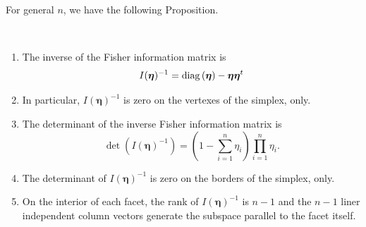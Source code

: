 \documentclass[12pt,a4paper]{amsart}
\begin{document}
For general $n$, we have the following Proposition.
%
\begin{proposition}\label{prop:I-1} \
\begin{enumerate}
\item The inverse of the Fisher information matrix is
\begin{equation*}
I(\bm\eta)^{-1}=\operatorname{diag}\left(\bm\eta\right)  - \bm\eta \bm\eta^t
\end{equation*}
\item In particular,  $I(\bm\eta)^{-1}$ is zero  on the vertexes of the simplex, only.
\item The determinant of the inverse Fisher information matrix is
\begin{equation*}
\det\left(I(\bm\eta)^{-1}\right)=\left(1- \sum_{i=1}^n  \eta_i\right)  \prod_{i=1}^n \eta_i .
\end{equation*}
\item The determinant of $I(\bm\eta)^{-1}$  is zero on the borders of the simplex, only.
\item On the interior of each  facet, the rank of  $I(\bm\eta)^{-1}$ is $n-1$ and the $n-1$ liner independent column vectors  generate the subspace parallel to the facet itself.
\end{enumerate}
\end{proposition}
\end{document}
